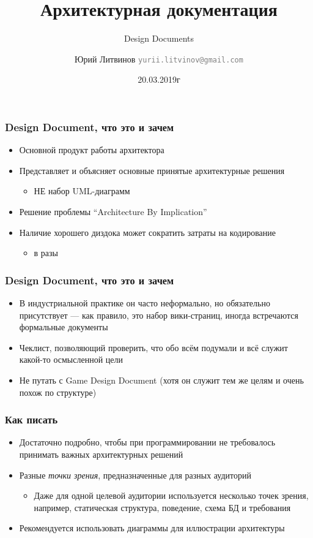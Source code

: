 \documentclass[xetex,mathserif,serif]{beamer}
\title{Архитектурная документация}
\subtitle{Design Documents}
\author[Юрий Литвинов]{Юрий Литвинов \newline \textcolor{gray}{\small\texttt{yurii.litvinov@gmail.com}}}
\date{20.03.2019г}
\begin{document}
	
	\frame{\titlepage}

	\begin{frame}
		\frametitle{Design Document, что это и зачем}
		\begin{itemize}
			\item Основной продукт работы архитектора
			\item Представляет и объясняет основные принятые архитектурные решения
			\begin{itemize}
				\item НЕ набор UML-диаграмм
			\end{itemize}
			\item Решение проблемы ``Architecture By Implication''
			\item Наличие хорошего диздока может сократить затраты на кодирование 
			\begin{itemize}
				\item в разы
			\end{itemize}
		\end{itemize}
	\end{frame}

	\begin{frame}
		\frametitle{Design Document, что это и зачем}
		\begin{itemize}
			\item В индустриальной практике он часто неформально, но обязательно присутствует --- как правило, это набор вики-страниц, иногда встречаются формальные документы
			\item Чеклист, позволяющий проверить, что обо всём подумали и всё служит какой-то осмысленной цели
			\item Не путать с Game Design Document (хотя он служит тем же целям и очень похож по структуре)
		\end{itemize}
	\end{frame}

	\begin{frame}
		\frametitle{Как писать}
		\begin{itemize}
			\item Достаточно подробно, чтобы при программировании не требовалось принимать важных архитектурных решений
			\item Разные \textit{точки зрения}, предназначенные для разных аудиторий
			\begin{itemize}
				\item Даже для одной целевой аудитории используется несколько точек зрения, например, статическая структура, поведение, схема БД и требования
			\end{itemize}
			\item Рекомендуется использовать диаграммы для иллюстрации архитектуры
		\end{itemize}
	\end{frame}
\end{document}
